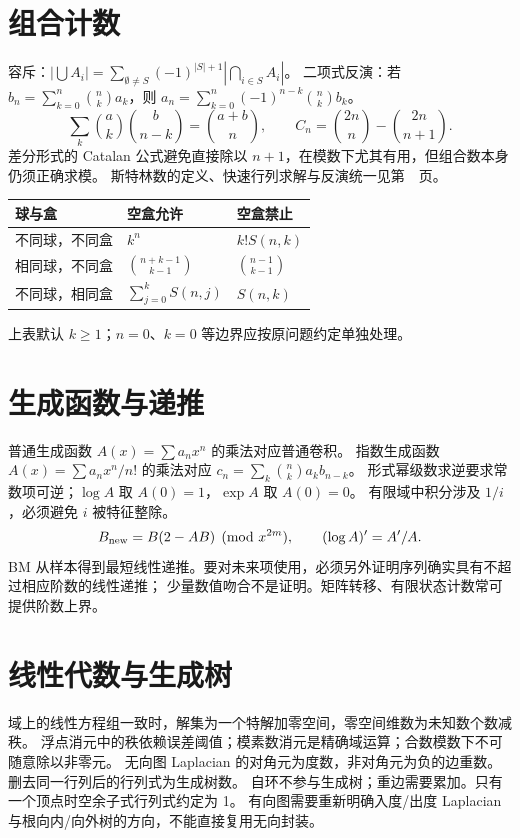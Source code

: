 \section{组合计数}\label{knowledge-counting-identities}
容斥：$|\bigcup A_i|=\sum_{\emptyset\ne S}(-1)^{|S|+1}|\bigcap_{i\in S}A_i|$。
二项式反演：若 $b_n=\sum_{k=0}^{n}\binom nk a_k$，则
$a_n=\sum_{k=0}^{n}(-1)^{n-k}\binom nk b_k$。
\[
\sum_k\binom ak\binom b{n-k}=\binom{a+b}n,\qquad
C_n=\binom{2n}n-\binom{2n}{n+1}.
\]
差分形式的 Catalan 公式避免直接除以 $n+1$，在模数下尤其有用，但组合数本身仍须正确求模。
斯特林数的定义、快速行列求解与反演统一见第~\pageref{knowledge-stirling-definitions}~页。
\begin{center}
\begin{tabular}{lll}
\toprule
球与盒 & 空盒允许 & 空盒禁止\\\midrule
不同球，不同盒 & $k^n$ & $k!S(n,k)$\\
相同球，不同盒 & $\binom{n+k-1}{k-1}$ & $\binom{n-1}{k-1}$\\
不同球，相同盒 & $\sum_{j=0}^{k}S(n,j)$ & $S(n,k)$\\
\bottomrule
\end{tabular}
\end{center}
上表默认 $k\ge1$；$n=0$、$k=0$ 等边界应按原问题约定单独处理。

\section{生成函数与递推}\label{knowledge-generating-recurrence}
普通生成函数 $A(x)=\sum a_nx^n$ 的乘法对应普通卷积。
指数生成函数 $A(x)=\sum a_nx^n/n!$ 的乘法对应
$c_n=\sum_k\binom nk a_kb_{n-k}$。
形式幂级数求逆要求常数项可逆；$\log A$ 取 $A(0)=1$，$\exp A$ 取 $A(0)=0$。
有限域中积分涉及 $1/i$，必须避免 $i$ 被特征整除。
\[
B_{\rm new}=B(2-AB)\pmod{x^{2m}},\qquad
(\log A)'=A'/A.
\]
BM 从样本得到最短线性递推。要对未来项使用，必须另外证明序列确实具有不超过相应阶数的线性递推；
少量数值吻合不是证明。矩阵转移、有限状态计数常可提供阶数上界。

\section{线性代数与生成树}\label{knowledge-matrix-span}
域上的线性方程组一致时，解集为一个特解加零空间，零空间维数为未知数个数减秩。
浮点消元中的秩依赖误差阈值；模素数消元是精确域运算；合数模数下不可随意除以非零元。
无向图 Laplacian 的对角元为度数，非对角元为负的边重数。删去同一行列后的行列式为生成树数。
自环不参与生成树；重边需要累加。只有一个顶点时空余子式行列式约定为 1。
有向图需要重新明确入度/出度 Laplacian 与根向内/向外树的方向，不能直接复用无向封装。

